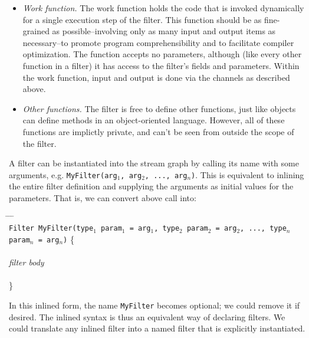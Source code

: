 \documentclass[draft]{article}
\begin{document}
\begin{itemize}
\item {\it Work function.}  The work function holds the code that is
invoked dynamically for a single execution step of the filter.  This
function should be as fine-grained as possible--involving only as many
input and output items as necessary--to promote program
comprehensibility and to facilitate compiler optimization.  The
function accepts no parameters, although (like every other function in
a filter) it has access to the filter's fields and parameters.  Within
the work function, input and output is done via the channels as
described above.

\item {\it Other functions.}  The filter is free to define other
functions, just like objects can define methods in an object-oriented
language.  However, all of these functions are implictly private, and
can't be seen from outside the scope of the filter.

\end{itemize}

\medskip
{}
\medskip

A filter can be instantiated into the stream graph by calling its name
with some arguments, e.g. {\tt MyFilter(arg$_1$, arg$_2$, ...,
arg$_n$)}.  This is equivalent to inlining the entire filter
definition and supplying the arguments as initial values for the
parameters.  That is, we can convert above call into:

\begin{tabbing}
\hspace{0.2in} \= \hspace{0.2in} \= \hspace{0.2in} \= \hspace{0.2in} \= \\

{\tt Filter MyFilter(type$_1$ param$_1$ = arg$_1$, type$_2$ param$_2$
= arg$_2$, ..., type$_n$ param$_n$ = arg$_n$)} \{ \\ \\

\> {\it filter body} \\ \\
\}
\end{tabbing}

In this inlined form, the name {\tt MyFilter} becomes optional; we
could remove it if desired.  The inlined syntax is thus an equivalent
way of declaring filters.  We could translate any inlined filter into
a named filter that is explicitly instantiated.
\end{document}
